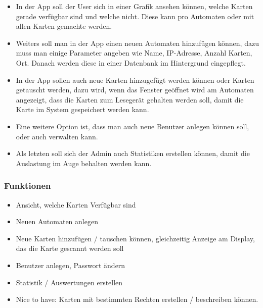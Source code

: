 \documentclass[a4paper]{article}
\begin{document}
\begin{itemize}
  \item In der App soll der User sich in einer Grafik ansehen können, welche Karten gerade verfügbar sind und welche nicht. Diese kann pro Automaten oder mit allen Karten gemachte werden. 
  \item Weiters soll man in der App einen neuen Automaten hinzufügen können, dazu muss man einige Parameter angeben wie Name, IP-Adresse, Anzahl Karten, Ort. Danach werden diese in einer Datenbank im Hintergrund eingepflegt. 
  \item In der App sollen auch neue Karten hinzugefügt werden können oder Karten getauscht werden, dazu wird, wenn das Fenster geöffnet wird am Automaten angezeigt, dass die Karten zum Lesegerät gehalten werden soll, damit die Karte im System gespeichert werden kann.
  \item Eine weitere Option ist, dass man auch neue Benutzer anlegen können soll, oder auch verwalten kann.
  \item Als letzten soll sich der Admin auch Statistiken erstellen können, damit die Auslastung im Auge behalten werden kann.
\end{itemize}

\subsubsection{Funktionen}
\begin{itemize}
 \item Ansicht, welche Karten Verfügbar sind
 \item Neuen Automaten anlegen
 \item Neue Karten hinzufügen / tauschen können, gleichzeitig Anzeige am Display, das die Karte gescannt werden soll
 \item Benutzer anlegen, Passwort ändern
 \item Statistik / Auswertungen erstellen
 \item Nice to have: Karten mit bestimmten Rechten erstellen / beschreiben können.
\end{itemize}
\end{document}
